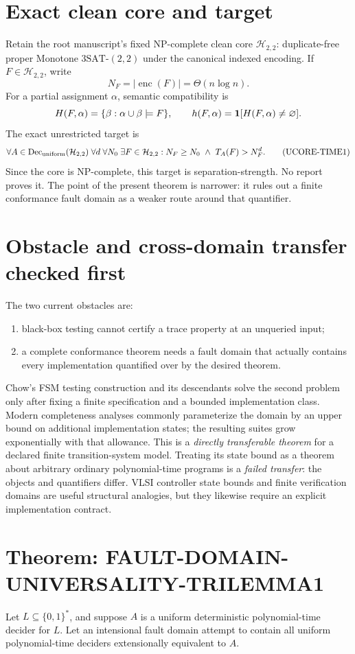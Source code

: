 \documentclass[11pt]{article}
\begin{document}
\section*{Exact clean core and target}
Retain the root manuscript's fixed NP-complete clean core
\(\mathcal H_{2,2}\): duplicate-free proper Monotone
\(3\mathrm{SAT}\text{-}(2,2)\) under the canonical indexed encoding.  If
\(F\in\mathcal H_{2,2}\), write
\[
 N_F=|\operatorname{enc}(F)|=\Theta(n\log n).
\]
For a partial assignment \(\alpha\), semantic compatibility is
\[
 H(F,\alpha)=\{\beta:\alpha\cup\beta\models F\},\qquad
 h(F,\alpha)={\bf 1}[H(F,\alpha)\ne\varnothing].
\]
The exact unrestricted target is
\[
 \forall A\in\operatorname{Dec}_{\rm uniform}(\mathcal H_{2,2})\;
 \forall d\;\forall N_0\;\exists F\in\mathcal H_{2,2}:
 N_F\ge N_0\ \land\ T_A(F)>N_F^d.                 \tag{UCORE-TIME1}
\]
Since the core is NP-complete, this target is separation-strength.  No report
proves it.  The point of the present theorem is narrower: it rules out a finite
conformance fault domain as a weaker route around that quantifier.

\section*{Obstacle and cross-domain transfer checked first}
The two current obstacles are:
\begin{enumerate}
\item black-box testing cannot certify a trace property at an unqueried input;
\item a complete conformance theorem needs a fault domain that actually
contains every implementation quantified over by the desired theorem.
\end{enumerate}
Chow's FSM testing construction and its descendants solve the second problem
only after fixing a finite specification and a bounded implementation class.
Modern completeness analyses commonly parameterize the domain by an upper
bound on additional implementation states; the resulting suites grow
exponentially with that allowance.  This is a \emph{directly transferable
theorem} for a declared finite transition-system model.  Treating its state
bound as a theorem about arbitrary ordinary polynomial-time programs is a
\emph{failed transfer}: the objects and quantifiers differ.  VLSI controller
state bounds and finite verification domains are useful structural analogies,
but they likewise require an explicit implementation contract.

\section*{Theorem: FAULT-DOMAIN-UNIVERSALITY-TRILEMMA1}
Let \(L\subseteq\{0,1\}^*\), and suppose \(A\) is a uniform deterministic
polynomial-time decider for \(L\).  Let an intensional fault domain attempt to
contain all uniform polynomial-time deciders extensionally equivalent to
\(A\).
\end{document}

